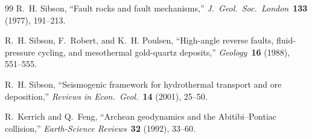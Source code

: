 \documentclass[11pt,a4paper]{article}
\begin{document}
\begin{thebibliography}{99}
R.~H. Sibson, ``Fault rocks and fault mechanisms,''
\textit{J.\ Geol.\ Soc.\ London}\ \textbf{133} (1977), 191--213.

R.~H. Sibson, F.~Robert, and K.~H. Poulsen, ``High-angle reverse faults, fluid-pressure cycling, and mesothermal gold-quartz deposits,''
\textit{Geology}\ \textbf{16} (1988), 551--555.

R.~H. Sibson, ``Seismogenic framework for hydrothermal transport and ore deposition,''
\textit{Reviews in Econ.\ Geol.}\ \textbf{14} (2001), 25--50.

R.~Kerrich and Q.~Feng, ``Archean geodynamics and the Abitibi--Pontiac collision,''
\textit{Earth-Science Reviews}\ \textbf{32} (1992), 33--60.

\end{thebibliography}
\end{document}

